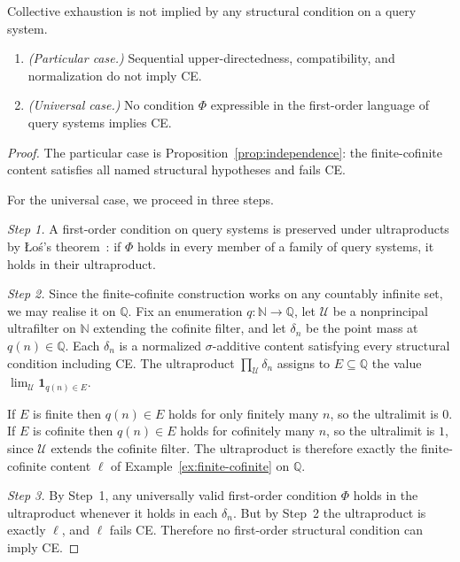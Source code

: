 \begin{proposition}
\label{prop:ce-irred}
Collective exhaustion is not implied by any structural condition on a query system.
\begin{enumerate}[label=(\roman*)]
  \item \emph{(Particular case.)}  Sequential upper-directedness, compatibility,
        and normalization do not imply CE.
  \item \emph{(Universal case.)}  No condition $\Phi$ expressible in the
        first-order language of query systems implies CE.
\end{enumerate}
\end{proposition}

\begin{proof}
The particular case is Proposition~\ref{prop:independence}: the finite-cofinite content satisfies all named structural hypotheses and fails CE.

For the universal case, we proceed in three steps.

\textit{Step 1.}
A first-order condition on query systems is preserved under ultraproducts by
\L{}o\'{s}'s theorem~\cite{Los1955}: if $\Phi$ holds in every member of a family
of query systems, it holds in their ultraproduct.

\textit{Step 2.}
Since the finite-cofinite construction works on any countably infinite set, we may realise it on $\mathbb{Q}$.  Fix an enumeration $q : \mathbb{N} \to
\mathbb{Q}$, let $\mathcal{U}$ be a nonprincipal ultrafilter on $\mathbb{N}$
extending the cofinite filter, and let $\delta_n$ be the point mass at $q(n) \in \mathbb{Q}$.  Each $\delta_n$ is a normalized $\sigma$-additive content satisfying every structural condition including CE.  The ultraproduct $\prod_{\mathcal{U}} \delta_n$ assigns to $E \subseteq \mathbb{Q}$ the value $\lim_{\mathcal{U}} \mathbf{1}_{q(n) \in E}$.

If $E$ is finite then $q(n) \in E$ holds for only finitely many $n$, so the ultralimit is $0$.  If $E$ is cofinite then $q(n) \in E$ holds for cofinitely many $n$, so the ultralimit is $1$, since $\mathcal{U}$ extends the cofinite filter.  The ultraproduct is therefore exactly the finite-cofinite content $\ell$ of Example~\ref{ex:finite-cofinite} on $\mathbb{Q}$.

\textit{Step 3.}
By Step~1, any universally valid first-order condition $\Phi$ holds in the ultraproduct whenever it holds in each $\delta_n$.  But by Step~2 the ultraproduct is exactly $\ell$, and $\ell$ fails CE.  Therefore no first-order structural condition can imply CE.
\end{proof}

